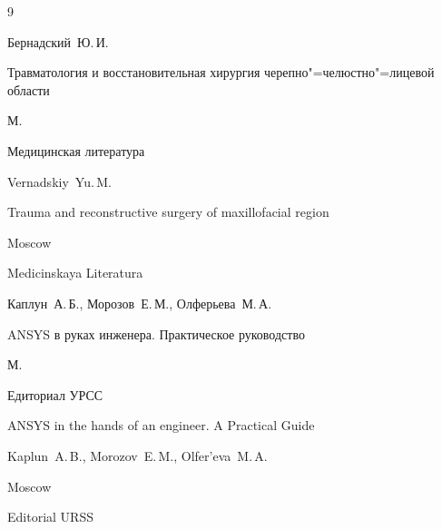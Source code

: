\begin{thebibliography}{9}




\by Бернадский~Ю.\,И.

\book Травматология и восстановительная хирургия черепно"=челюстно"=лицевой области

\publaddr М.

\publ Медицинская литература



\misctransl

\by Vernadskiy~Yu.\,M.


\book Trauma and reconstructive surgery of maxillofacial region

\publaddr Moscow

\publ Medicinskaya Literatura





\by Каплун~А.\,Б., Морозов~Е.\,М., Олферьева~М.\,А.

\book ANSYS в руках инженера. Практическое руководство

\publaddr М.

\publ Едиториал УРСС



\misctransl

\book ANSYS in the hands of an engineer. A Practical Guide

\by Kaplun~A.\,B., Morozov~E.\,M., Olfer'eva~M.\,A.

\publaddr Moscow

\publ Editorial URSS





\end{thebibliography}







\noindent

\hskip6.5cm \thedate \par\noindent

\hskip6.5cm\therevdate















\makeengtitlem



\newpage





%


